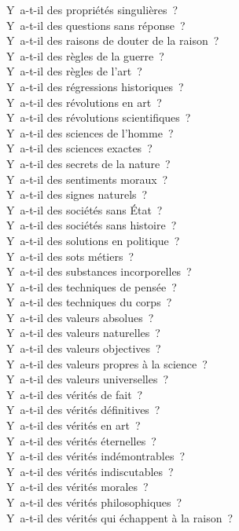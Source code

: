 \documentclass[a4paper,12pt]{article}
\begin{document}
Y a-t-il des propriétés singulières ? \\
Y a-t-il des questions sans réponse ? \\
Y a-t-il des raisons de douter de la raison ? \\
Y a-t-il des règles de la guerre ? \\
Y a-t-il des règles de l'art ? \\
Y a-t-il des régressions historiques ? \\
Y a-t-il des révolutions en art ? \\
Y a-t-il des révolutions scientifiques ? \\
Y a-t-il des sciences de l'homme ? \\
Y a-t-il des sciences exactes ? \\
Y a-t-il des secrets de la nature ? \\
Y a-t-il des sentiments moraux ? \\
Y a-t-il des signes naturels ? \\
Y a-t-il des sociétés sans État ? \\
Y a-t-il des sociétés sans histoire ? \\
Y a-t-il des solutions en politique ? \\
Y a-t-il des sots métiers ? \\
Y a-t-il des substances incorporelles ? \\
Y a-t-il des techniques de pensée ? \\
Y a-t-il des techniques du corps ? \\
Y a-t-il des valeurs absolues ? \\
Y a-t-il des valeurs naturelles ? \\
Y a-t-il des valeurs objectives ? \\
Y a-t-il des valeurs propres à la science ? \\
Y a-t-il des valeurs universelles ? \\
Y a-t-il des vérités de fait ? \\
Y a-t-il des vérités définitives ? \\
Y a-t-il des vérités en art ? \\
Y a-t-il des vérités éternelles ? \\
Y a-t-il des vérités indémontrables ? \\
Y a-t-il des vérités indiscutables ? \\
Y a-t-il des vérités morales ? \\
Y a-t-il des vérités philosophiques ? \\
Y a-t-il des vérités qui échappent à la raison ? \\
\end{document}
